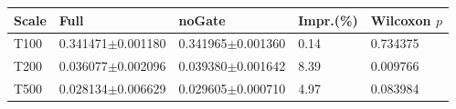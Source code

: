\begin{tabular}{lllll}
\hline
Scale & Full & noGate & Impr.(\%) & Wilcoxon $p$ \\
\hline
T100 & 0.341471$\pm$0.001180 & 0.341965$\pm$0.001360 & 0.14 & 0.734375 \\
T200 & 0.036077$\pm$0.002096 & 0.039380$\pm$0.001642 & 8.39 & 0.009766 \\
T500 & 0.028134$\pm$0.006629 & 0.029605$\pm$0.000710 & 4.97 & 0.083984 \\
\hline
\end{tabular}